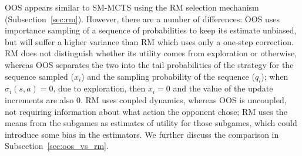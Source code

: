 {OOS appears similar to SM-MCTS using the RM selection mechanism (Subsection~\ref{sec:rm}). However, there are a number of differences:
OOS uses importance sampling of a sequence of probabilities to keep its estimate unbiased, but will suffer a higher variance than RM which uses only a one-step correction.
RM does not distinguish whether its utility comes from exploration or otherwise, whereas OOS separates the two into the tail probabilities of the strategy for the sequence
sampled ($x_i$) and the sampling probability of the sequence ($q_i$); when $\sigma_i(s,a) = 0$, due to exploration, then $x_i = 0$ and the value of the update increments
are also $0$. RM uses coupled dynamics, whereas OOS is uncoupled, not requiring information about what action the opponent chose; RM uses the means from the subgames
as estimates of utility for those subgames, which could introduce some bias in the estimators. We further discuss the comparison in Subsection~\ref{sec:oos_vs_rm}.}

